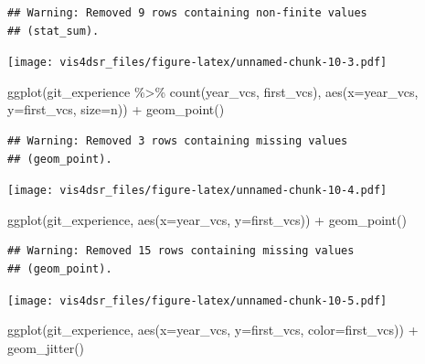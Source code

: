 \documentclass[
]{krantz}
\makeatletter
\newenvironment{Shaded}{\begin{snugshade}}{\end{snugshade}}
\newcommand{\AttributeTok}[1]{\textcolor[rgb]{0.61,0.61,0.61}{#1}}
\newcommand{\FunctionTok}[1]{\textcolor[rgb]{0,0,0}{#1}}
\newcommand{\NormalTok}[1]{#1}
\newcommand{\SpecialCharTok}[1]{\textcolor[rgb]{0,0,0}{#1}}
\newenvironment{kframe}{%
\medskip{}
\setlength{\fboxsep}{.8em}
 \def\at@end@of@kframe{}%
 \ifinner\ifhmode%
  \def\at@end@of@kframe{\end{minipage}}%
  \begin{minipage}{\columnwidth}%
 \fi\fi%
 \def\FrameCommand##1{\hskip\@totalleftmargin \hskip-\fboxsep
 \colorbox{shadecolor}{##1}\hskip-\fboxsep
     \hskip-\linewidth \hskip-\@totalleftmargin \hskip\columnwidth}%
 \MakeFramed {\advance\hsize-\width
   \@totalleftmargin\z@ \linewidth\hsize
   \@setminipage}}%
 {\par\unskip\endMakeFramed%
 \at@end@of@kframe}
\renewenvironment{Shaded}{\begin{kframe}}{\end{kframe}}
\makeatother
\begin{document}
\begin{verbatim}
## Warning: Removed 9 rows containing non-finite values
## (stat_sum).
\end{verbatim}

\texttt{[image: vis4dsr\_files/figure-latex/unnamed-chunk-10-3.pdf]}

\begin{Shaded}
\begin{Highlighting}[]
\FunctionTok{ggplot}\NormalTok{(git\_experience }\SpecialCharTok{\%\textgreater{}\%} \FunctionTok{count}\NormalTok{(year\_vcs, first\_vcs), }
       \FunctionTok{aes}\NormalTok{(}\AttributeTok{x=}\NormalTok{year\_vcs, }\AttributeTok{y=}\NormalTok{first\_vcs, }\AttributeTok{size=}\NormalTok{n)) }\SpecialCharTok{+}
  \FunctionTok{geom\_point}\NormalTok{()}
\end{Highlighting}
\end{Shaded}

\begin{verbatim}
## Warning: Removed 3 rows containing missing values
## (geom_point).
\end{verbatim}

\texttt{[image: vis4dsr\_files/figure-latex/unnamed-chunk-10-4.pdf]}

\begin{Shaded}
\begin{Highlighting}[]
\FunctionTok{ggplot}\NormalTok{(git\_experience, }\FunctionTok{aes}\NormalTok{(}\AttributeTok{x=}\NormalTok{year\_vcs, }\AttributeTok{y=}\NormalTok{first\_vcs)) }\SpecialCharTok{+}
  \FunctionTok{geom\_point}\NormalTok{()}
\end{Highlighting}
\end{Shaded}

\begin{verbatim}
## Warning: Removed 15 rows containing missing values
## (geom_point).
\end{verbatim}

\texttt{[image: vis4dsr\_files/figure-latex/unnamed-chunk-10-5.pdf]}

\begin{Shaded}
\begin{Highlighting}[]
\FunctionTok{ggplot}\NormalTok{(git\_experience, }\FunctionTok{aes}\NormalTok{(}\AttributeTok{x=}\NormalTok{year\_vcs, }\AttributeTok{y=}\NormalTok{first\_vcs, }\AttributeTok{color=}\NormalTok{first\_vcs)) }\SpecialCharTok{+}
  \FunctionTok{geom\_jitter}\NormalTok{()}
\end{Highlighting}
\end{Shaded}
\end{document}

